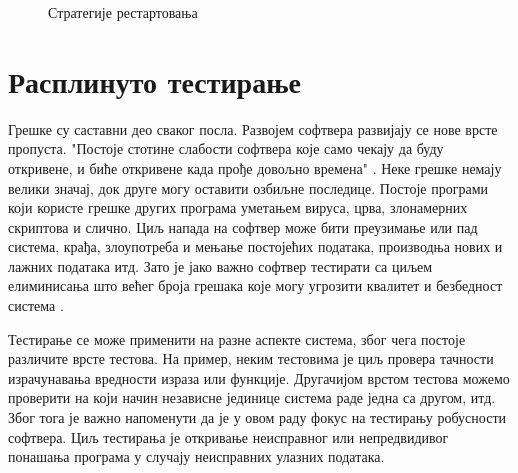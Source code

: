 \documentclass[12pt,oneside]{memoir}
\begin{document}
\begin{figure}[!tbp]
  \centering
  \hfill
  \caption{Стратегије рестартовања}
\end{figure}



\chapter{Расплинуто тестирање}
\label{chp:rasplTestiranje}

Грешке су саставни део сваког посла. Развојем софтвера развијају се нове врсте пропуста. "Постоје стотине слабости софтвера које само чекају да буду откривене, и биће откривене када прође довољно времена" \cite{fuzzing}. Неке грешке немају велики значај, док друге могу оставити озбиљне последице. Постоје програми који користе грешке других програма уметањем вируса, црва, злонамерних скриптова и слично. Циљ напада на софтвер може бити преузимање или пад система, крађа, злоупотреба и мењање постојећих података, производња нових и лажних података итд.  Зато је јако важно софтвер тестирати са циљем елиминисања што већег броја грешака које могу угрозити квалитет и безбедност система \cite{fuzzing, bezbMalkov}.

Тестирање се може применити на разне аспекте система, због чега постоје различите врсте тестова. На пример, неким тестовима је циљ провера тачности израчунавања вредности израза или функције. Другачијом врстом тестова можемо проверити на који начин независне јединице система раде једна са другом, итд. Због тога је важно напоменути да је у овом раду фокус на тестирању робусности софтвера. Циљ тестирања је откривање неисправног или непредвидивог понашања програма у случају неисправних улазних података. 
\end{document}
